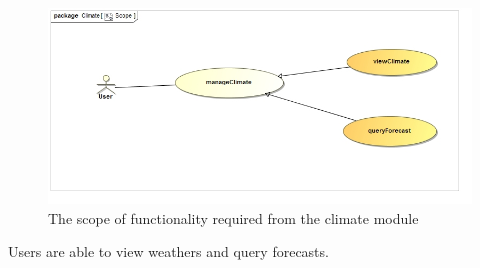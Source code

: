 
\begin{figure}[H]
	\centering
	\includegraphics[width=1.0\textwidth]{../images/funcReq/ClimateScope.jpg}
	\caption{The scope of functionality required from the climate module \label{overflow}}
\end{figure} Users are able to view weathers and query forecasts.